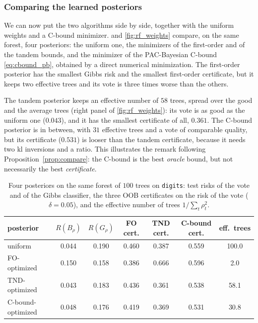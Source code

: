 \subsubsection{Comparing the learned posteriors}

We can now put the two algorithms side by side, together with the uniform
weights and a C-bound minimizer.  and \cref{fig:rf_weights} compare, on the same forest,
four posteriors: the uniform one, the minimizers of the first-order and of the
tandem bounds, and the minimizer of the PAC-Bayesian C-bound \eqref{eq:cbound_pb},
obtained by a direct numerical minimization. The first-order posterior has the
smallest Gibbs risk and the smallest first-order certificate, but it keeps two
effective trees and its vote is three times worse than the others.

The tandem posterior keeps an effective number of $58$ trees, spread over the good and
the average trees (right panel of \cref{fig:rf_weights}): its vote is as good as
the uniform one ($0.043$), and it has the smallest certificate of all, $0.361$.
The C-bound posterior is in between, with $31$ effective trees and a vote of
comparable quality, but its certificate ($0.531$) is looser than the tandem
certificate, because it needs two kl inversions and a ratio. This illustrates the
remark following Proposition~\ref{prop:compare}: the C-bound is the best
\emph{oracle} bound, but not necessarily the best \emph{certificate}.

\begin{table}[t]
\centering\small
\caption{Four posteriors on the same forest of $100$ trees on \texttt{digits}:
test risks of the vote and of the Gibbs classifier, the three OOB certificates on the risk
of the vote ($\delta=0.05$), and the effective number of trees $1/\sum_t\rho_t^2$.}
\label{tab:rf_posteriors}
\setlength{\tabcolsep}{3.5pt}
\begin{tabular}{lcccccc}
\toprule
posterior & $R(B_\rho)$ & $R(G_\rho)$ & FO cert. & TND cert. & C-bound cert. & eff.\ trees \\
\midrule
uniform & 0.044 & 0.190 & 0.460 & 0.387 & 0.559 & 100.0 \\
FO-optimized & 0.150 & 0.158 & 0.386 & 0.666 & 0.596 & 2.0 \\
TND-optimized & 0.043 & 0.183 & 0.436 & 0.361 & 0.538 & 58.1 \\
C-bound-optimized & 0.048 & 0.176 & 0.419 & 0.369 & 0.531 & 30.8 \\
\bottomrule
\end{tabular}
\end{table}

